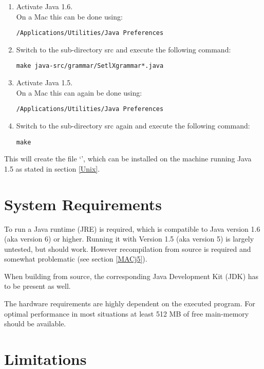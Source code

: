 \begin{enumerate}
	\item Activate Java 1.6.\\
		On a Mac this can be done using:
\begin{lstlisting}[frame=none,numbers=none]
/Applications/Utilities/Java Preferences
\end{lstlisting}
	\item Switch to the sub-directory src and execute the following command:
\begin{lstlisting}[frame=none,numbers=none]
make java-src/grammar/SetlXgrammar*.java
\end{lstlisting}
	\item Activate Java 1.5.\\
		On a Mac this can again be done using:
\begin{lstlisting}[frame=none,numbers=none]
/Applications/Utilities/Java Preferences
\end{lstlisting}
	\item Switch to the sub-directory src again and execute the following command:
\begin{lstlisting}[frame=none,numbers=none]
make
\end{lstlisting}
\end{enumerate}
This will create the file `', which can be installed on the machine running Java 1.5 as stated in section \ref{Unix}.

\section{System Requirements}

To run \setlX{} a Java runtime (JRE) is required, which is compatible to Java version 1.6 (aka version 6) or higher. Running it with Version 1.5 (aka version 5) is largely untested, but should work. However recompilation from source is required and somewhat problematic (see section \ref{MACj5}).

When building from source, the corresponding Java Development Kit (JDK) has to be present as well.

The hardware requirements are highly dependent on the executed \SetlX{} program. For optimal performance in most situations at least 512 MB of free main-memory should be available.

\section{Limitations}

